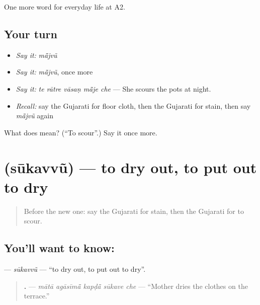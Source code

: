 \begin{grammarlens}[title={What you've built}]
One more word for everyday life at A2.
\end{grammarlens}

\subsection*{Your turn}
\begin{itemize}
\raggedright
  \item \emph{Say it:} \emph{mā̃jvũ}
  \item \emph{Say it:} \emph{mā̃jvũ}, once more
  \item \emph{Say it:} \emph{te rātre vāsaṇ mā̃je che} — She scours the pots at night.
  \item \emph{Recall:} say the Gujarati for floor cloth, then the Gujarati for stain, then say \emph{mā̃jvũ} again
\end{itemize}

\begin{tcolorbox}[breakable,colback=teal!4,colframe=teal!35!black,title={Before you move on}]
What does  mean? (\textquotedblleft{}To scour\textquotedblright{}.) Say it once more.
\end{tcolorbox}
\section[\texorpdfstring{\gu{સૂકવવું} (sūkavvũ)}{સૂકવવું (sūkavvũ)}]{ (sūkavvũ) — to dry out, to put out to dry}

\label{lesson:GU-C159-sukavvu}



\begin{quote}
Before the new one: say the Gujarati for stain, then the Gujarati for to scour.
\end{quote}

\subsection*{You'll want to know: }
\textbf{} — \emph{sūkavvũ} — \textquotedblleft{}to dry out, to put out to dry\textquotedblright{}.

\begin{quote}
\textbf{    .} — \emph{mātā agāsīmā̃ kapḍā̃ sūkave che} — \textquotedblleft{}Mother dries the clothes on the terrace.\textquotedblright{}
\end{quote}


